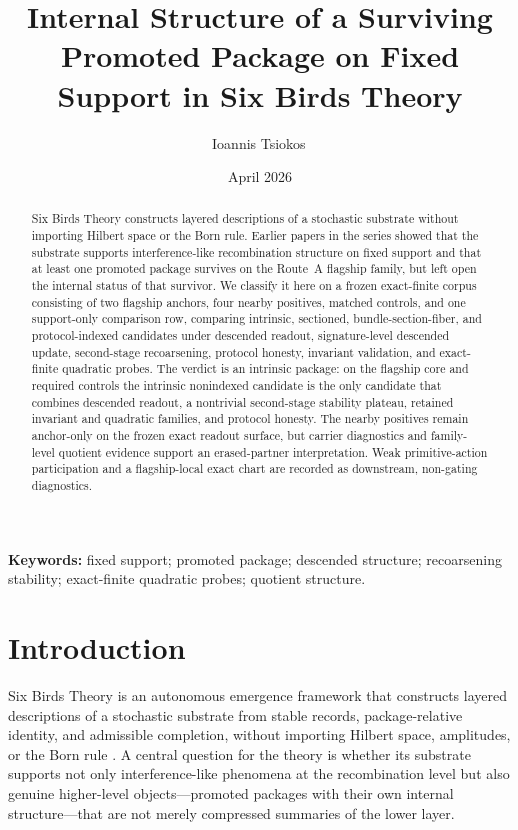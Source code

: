 \documentclass[11pt]{article}
\title{Internal Structure of a Surviving Promoted Package on Fixed Support in Six Birds Theory}
\author{Ioannis Tsiokos\,\orcidlink{0009-0009-7659-5964}}
\date{April 2026}
\theoremstyle{definition}
\begin{document}
\maketitle
\thispagestyle{firstpage}

\begin{abstract}
Six Birds Theory constructs layered descriptions of a stochastic substrate without importing Hilbert space or the Born rule. Earlier papers in the series showed that the substrate supports interference-like recombination structure on fixed support and that at least one promoted package survives on the Route~A flagship family, but left open the internal status of that survivor. We classify it here on a frozen exact-finite corpus consisting of two flagship anchors, four nearby positives, matched controls, and one support-only comparison row, comparing intrinsic, sectioned, bundle-section-fiber, and protocol-indexed candidates under descended readout, signature-level descended update, second-stage recoarsening, protocol honesty, invariant validation, and exact-finite quadratic probes. The verdict is an intrinsic package: on the flagship core and required controls the intrinsic nonindexed candidate is the only candidate that combines descended readout, a nontrivial second-stage stability plateau, retained invariant and quadratic families, and protocol honesty. The nearby positives remain anchor-only on the frozen exact readout surface, but carrier diagnostics and family-level quotient evidence support an erased-partner interpretation. Weak primitive-action participation and a flagship-local exact chart are recorded as downstream, non-gating diagnostics.
\end{abstract}

\medskip
\noindent\textbf{Keywords:} fixed support; promoted package; descended structure; recoarsening stability; exact-finite quadratic probes; quotient structure.

\section{Introduction}

Six Birds Theory is an autonomous emergence framework that constructs layered descriptions of a stochastic substrate from stable records, package-relative identity, and admissible completion, without importing Hilbert space, amplitudes, or the Born rule \cite{Tsiokos2026EventPackages,Tsiokos2026PredictiveQuotients}. A central question for the theory is whether its substrate supports not only interference-like phenomena at the recombination level but also genuine higher-level objects---promoted packages with their own internal structure---that are not merely compressed summaries of the lower layer.
\end{document}
